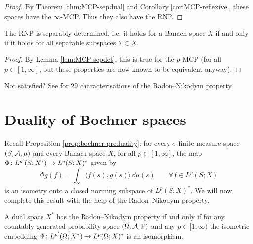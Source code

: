 \begin{proof}
  By Theorem \ref{thm:MCP-sepdual} and Corollary \ref{cor:MCP-reflexive}, these spaces have the $\infty$-MCP.
  Thus they also have the RNP.
\end{proof}

\begin{cor}
  The RNP is separably determined, i.e. it holds for a Banach space $X$ if and only if it holds for all separable subspaces $Y \subset X$.
\end{cor}

\begin{proof}
  By Lemma \ref{lem:MCP-sepdet}, this is true for the $p$-MCP (for all $p \in [1,\infty]$, but these properties are now known to be equivalent anyway). 
\end{proof}

\begin{rmk}
  Not satisfied? See \cite[\textsection VII.6]{DU77} for 29 characterisations of the Radon--Nikodym property.
\end{rmk}

\section{Duality of Bochner spaces}

Recall Proposition \ref{prop:bochner-preduality}: for every $\sigma$-finite measure space $(S,\mathcal{A},\mu)$ and every Banach space $X$, for all $p \in [1,\infty]$, the map $\Phi \colon L^{p'}(S;X^*) \rightarrow L^p(S;X)^*$ given by
\begin{equation*}
  \Phi g(f) = \int_{S} \langle f(s), g(s) \rangle \, \dd\mu(s) \qquad \forall f \in L^p(S;X)
\end{equation*}
is an isometry onto a closed norming subspace of $L^p(S;X)^*$.
We will now complete this result with the help of the Radon--Nikodym property.

\begin{thm}
  A dual space $X^*$ has the Radon--Nikodym property if and only if for any countably generated probability space $(\Omega,\mathcal{A},\mathbb{P})$ and any $p \in [1,\infty)$ the isometric embedding $\Phi \colon L^{p'}(\Omega;X^*) \rightarrow L^p(\Omega;X)^*$ is an isomorphism.
\end{thm}

